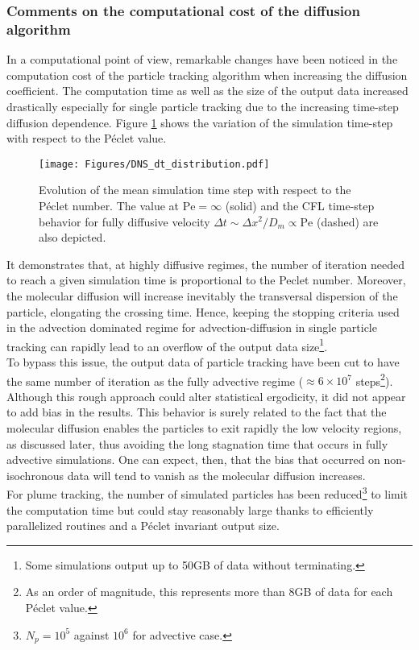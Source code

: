 \subsubsection{Comments on the computational cost of the diffusion algorithm}
In a computational point of view, remarkable changes have been noticed in the computation cost of the particle tracking algorithm when increasing the diffusion coefficient.
The computation time as well as the size of the output data increased drastically especially for single particle tracking due to the increasing time-step diffusion dependence.
Figure \ref{fig:time_step_pe} shows the variation of the simulation time-step with respect to the Péclet value. 
\begin{figure}[h!]
	\centering
	\texttt{[image: Figures/DNS\_dt\_distribution.pdf]}
	\caption{Evolution of the mean simulation time step with respect to the Péclet number. The value at $\mathrm{Pe} = \infty$ (solid) and the CFL time-step behavior for fully diffusive velocity $\Delta t\sim \Delta x^2/D_m \propto\mathrm{Pe}$ (dashed) are also depicted.}
	\label{fig:time_step_pe}
\end{figure}
It demonstrates that, at highly diffusive regimes, the number of iteration needed to reach a given simulation time is proportional to the Peclet number.
Moreover, the molecular diffusion will increase inevitably the transversal dispersion of the particle, 
elongating the crossing time. Hence, keeping the stopping criteria used in the advection dominated regime for advection-diffusion in single particle tracking can rapidly lead to an overflow of the output data size\footnote{Some simulations output up to 50GB of data without terminating.}.\\
To bypass this issue, the output data of particle tracking have been cut to have the same number of iteration as the fully advective regime ($\approx6 \times 10^7$ steps\footnote{As an order of magnitude, this represents more than 8GB of data for each Péclet value.}). 
Although this rough approach could alter statistical ergodicity, it did not appear to add bias in the results. 
This behavior is surely related to the fact that the molecular diffusion enables the particles to exit rapidly the low velocity regions, as discussed later, thus avoiding the long stagnation time that occurs in fully advective simulations. 
One can expect, then, that the bias that occurred on non-isochronous data will tend to vanish as the molecular diffusion increases.\\
For plume tracking, the number of simulated particles has been reduced\footnote{$N_p=10^5$ against $10^6$ for advective case.} to limit the computation time but could stay reasonably large thanks to efficiently parallelized routines and a Péclet invariant output size.

